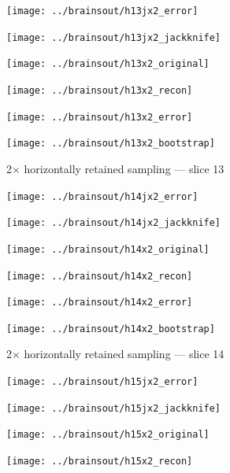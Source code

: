 \documentclass[article]{jdssv}
\begin{document}
\begin{appendix}
\begin{figure}
\begin{centering}
\parbox{\imsize}{\texttt{[image: ../brainsout/h13jx2\_error]}}
\parbox{\imsize}{\texttt{[image: ../brainsout/h13jx2\_jackknife]}}

\vspace{\vertsep}

\parbox{\imsize}{\texttt{[image: ../brainsout/h13x2\_original]}}
\parbox{\imsize}{\texttt{[image: ../brainsout/h13x2\_recon]}}

\vspace{\vertsep}

\parbox{\imsize}{\texttt{[image: ../brainsout/h13x2\_error]}}
\parbox{\imsize}{\texttt{[image: ../brainsout/h13x2\_bootstrap]}}

\end{centering}
\caption{2$\times$ horizontally retained sampling --- slice 13}
\end{figure}


\begin{figure}
\begin{centering}

\parbox{\imsize}{\texttt{[image: ../brainsout/h14jx2\_error]}}
\parbox{\imsize}{\texttt{[image: ../brainsout/h14jx2\_jackknife]}}

\vspace{\vertsep}

\parbox{\imsize}{\texttt{[image: ../brainsout/h14x2\_original]}}
\parbox{\imsize}{\texttt{[image: ../brainsout/h14x2\_recon]}}

\vspace{\vertsep}

\parbox{\imsize}{\texttt{[image: ../brainsout/h14x2\_error]}}
\parbox{\imsize}{\texttt{[image: ../brainsout/h14x2\_bootstrap]}}

\end{centering}
\caption{2$\times$ horizontally retained sampling --- slice 14}
\end{figure}


\begin{figure}
\begin{centering}

\parbox{\imsize}{\texttt{[image: ../brainsout/h15jx2\_error]}}
\parbox{\imsize}{\texttt{[image: ../brainsout/h15jx2\_jackknife]}}

\vspace{\vertsep}

\parbox{\imsize}{\texttt{[image: ../brainsout/h15x2\_original]}}
\parbox{\imsize}{\texttt{[image: ../brainsout/h15x2\_recon]}}

\vspace{\vertsep}


\end{centering}
\end{figure}
\end{appendix}
\end{document}
